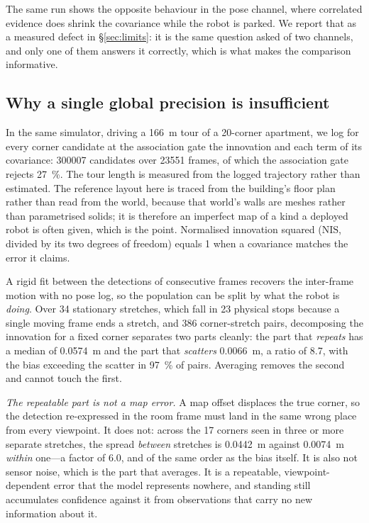 \documentclass[conference,letterpaper,10pt]{IEEEtran}
\newcommand{\nis}{\ensuremath{\mathrm{NIS}}}
\begin{document}
The same run shows the opposite behaviour in the pose channel, where correlated evidence does shrink
the covariance while the robot is parked. We report that as a measured defect in \S\ref{sec:limits}: it is the same
question asked of two channels, and only one of them answers it correctly, which is what makes the
comparison informative.

\subsection{Why a single global precision is insufficient}
\label{sec:notconstant}

In the same simulator, driving a \SI{166}{\meter} tour of a \num{20}-corner apartment, we log for
every corner candidate at the association gate the innovation and each term of its covariance:
\num{300007} candidates over \num{23551} frames, of which the association gate rejects
\SI{27}{\percent}. The tour length is measured from the logged trajectory rather than estimated. The reference layout here is traced from the building's floor plan rather
than read from the world, because that world's walls are meshes rather than parametrised solids; it
is therefore an imperfect map of a kind a deployed robot is often given, which is the point. Normalised innovation
squared ($\nis$, divided by its two degrees of freedom) equals 1 when a covariance matches the error
it claims.

A rigid fit between the detections of consecutive frames recovers the inter-frame motion with no
pose log, so the population can be split by what the robot is \emph{doing}.
Over \num{34} stationary stretches, which fall in \num{23} physical stops because a single moving
frame ends a stretch, and \num{386} corner-stretch pairs, decomposing the innovation for
a fixed corner separates two parts cleanly: the part that \emph{repeats} has a median of
\SI{0.0574}{\meter} and the part that \emph{scatters} \SI{0.0066}{\meter}, a ratio of \num{8.7}, with
the bias exceeding the scatter in \SI{97}{\percent} of pairs. Averaging removes the second and cannot
touch the first.

\emph{The repeatable part is not a map error.} A map offset displaces the true corner, so the
detection re-expressed in the room frame must land in the same wrong place from every viewpoint. It
does not: across the \num{17} corners seen in three or more separate stretches, the spread
\emph{between} stretches is \SI{0.0442}{\meter} against \SI{0.0074}{\meter} \emph{within} one---a
factor of \num{6.0}, and of the same order as the bias itself. It is also not sensor noise, which is the part that
averages. It is a repeatable, viewpoint-dependent error that the model represents nowhere, and
standing still accumulates confidence against it from observations that carry no new information
about it.
\end{document}
